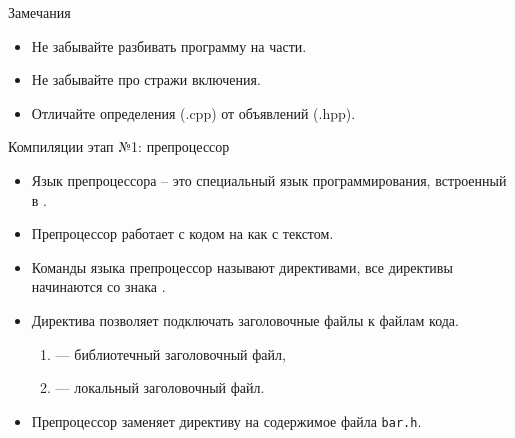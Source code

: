\documentclass[aspectration=1610,t]{beamer}
\begin{document}
\begin{frame}[fragile]{Замечания}
    \begin{itemize}
        \item Не забывайте разбивать программу на части.
        \item Не забывайте про стражи включения.
        \item Отличайте определения (.cpp) от объявлений (.hpp).
    \end{itemize}
\end{frame}

\begin{frame}[fragile] {Компиляции этап №1: препроцессор}
    \begin{itemize}
        \item Язык препроцессора -- это специальный язык программирования, 
            встроенный в \langcpp.
        \item Препроцессор работает с кодом на \langcpp как с текстом.
        \item Команды языка препроцессор называют директивами,              
            все директивы начинаются со знака \code{\#}.
        \item Директива  позволяет подключать заголовочные файлы к файлам
            кода.
        \begin{enumerate}
            \item {} --- библиотечный заголовочный файл,
            \item {} --- локальный заголовочный файл.
        \end{enumerate}
        \item Препроцессор заменяет директиву  на содержимое
        файла \texttt{bar.h}.
    \end{itemize}

%

\end{frame}
\end{document}
